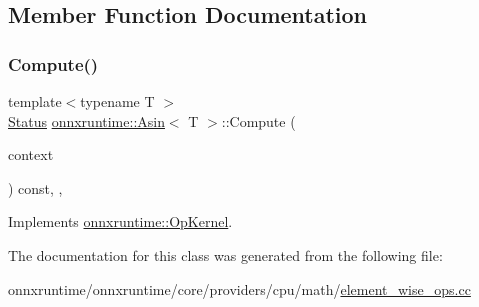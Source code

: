 \subsection{Member Function Documentation}
\mbox{\label{classonnxruntime_1_1Asin_aebed831576b92a58720e731a37be2035}} 
\subsubsection{\texorpdfstring{Compute()}{Compute()}}
{\footnotesize\ttfamily template$<$typename T $>$ \\
\mbox{\hyperlink{classonnxruntime_1_1common_1_1Status}{Status}} \mbox{\hyperlink{classonnxruntime_1_1Asin}{onnxruntime\+::\+Asin}}$<$ T $>$\+::Compute (\begin{DoxyParamCaption}\item[{\mbox{\hyperlink{classonnxruntime_1_1OpKernelContext}{Op\+Kernel\+Context}} $\ast$}]{context }\end{DoxyParamCaption}) const\hspace{0.3cm}{\ttfamily [inline]}, {\ttfamily [override]}, {\ttfamily [virtual]}}



Implements \mbox{\hyperlink{classonnxruntime_1_1OpKernel_a9eca8656a78b1b3ab9d3351a12798650}{onnxruntime\+::\+Op\+Kernel}}.



The documentation for this class was generated from the following file\+:\begin{DoxyCompactItemize}
\item 
onnxruntime/onnxruntime/core/providers/cpu/math/\mbox{\hyperlink{element__wise__ops_8cc}{element\+\_\+wise\+\_\+ops.\+cc}}\end{DoxyCompactItemize}
